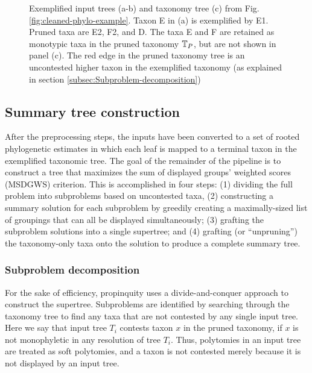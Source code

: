\documentclass[fleqn,12pt,lineno,english]{wlpeerj}
\begin{document}
\begin{figure}
\hfill{}\hfill{}

\caption{Exemplified input trees (a-b) and taxonomy tree (c) from Fig. \ref{fig:cleaned-phylo-example}.
Taxon E in (a) is exemplified by E1. Pruned taxa are E2, F2, and D. The
taxa E and F are retained as monotypic taxa in the pruned taxonomy
$\protect\mbox{\ensuremath{\mathbb{T}}}_{P}$, but are not shown in panel (c). The red
edge in the pruned taxonomy tree is an uncontested higher taxon in
the exemplified taxonomy (as explained in section \ref{subsec:Subproblem-decomposition})}
\label{fig:exemplify-example}
\end{figure}


\subsection{Summary tree construction}

After the preprocessing steps, the inputs have been converted to a
set of rooted phylogenetic estimates in which each leaf is mapped
to a terminal taxon in the exemplified taxonomic tree. The goal of
the remainder of the pipeline is to construct a tree that maximizes
the sum of displayed groups' weighted scores (MSDGWS) criterion. This is accomplished
in four steps: (1) dividing the full problem into subproblems based
on uncontested taxa, (2) constructing a summary solution for each
subproblem by greedily creating a maximally-sized list of groupings
that can all be displayed simultaneously; (3) grafting the subproblem
solutions into a single supertree; and (4) grafting (or ``unpruning'')
the taxonomy-only taxa onto the solution to produce a complete summary
tree.

\subsubsection{Subproblem decomposition\label{subsec:Subproblem-decomposition}}

For the sake of efficiency, propinquity uses a divide-and-conquer
approach to construct the supertree. Subproblems are identified by
searching through the taxonomy tree to find any taxa that are not contested
by any single input tree. Here we say that input tree $T_{i}$ contests
taxon $x$ in the pruned taxonomy, if $x$ is not monophyletic in
any resolution of tree $T_{i}$. Thus, polytomies in an input tree
are treated as soft polytomies, and a taxon is not contested merely
because it is not displayed by an input tree. 
\end{document}
